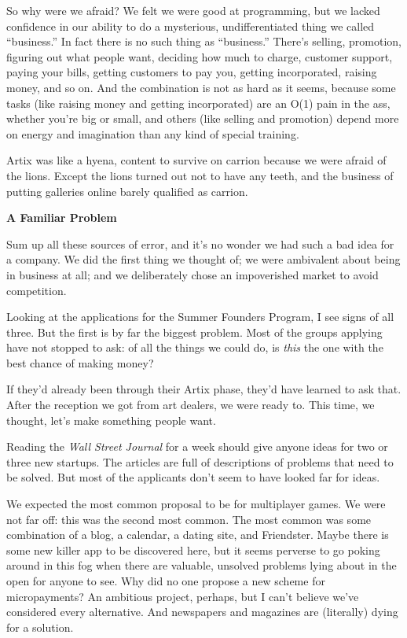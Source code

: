 So why were we afraid? We felt we were good at programming, but we
lacked confidence in our ability to do a mysterious, undifferentiated
thing we called ``business.'' In fact there is no such thing as
``business.'' There's selling, promotion, figuring out what people want,
deciding how much to charge, customer support, paying your bills,
getting customers to pay you, getting incorporated, raising money, and
so on. And the combination is not as hard as it seems, because some
tasks (like raising money and getting incorporated) are an O(1) pain in
the ass, whether you're big or small, and others (like selling and
promotion) depend more on energy and imagination than any kind of
special training.

Artix was like a hyena, content to survive on carrion because we were
afraid of the lions. Except the lions turned out not to have any teeth,
and the business of putting galleries online barely qualified as
carrion.

\textbf{A Familiar Problem}

Sum up all these sources of error, and it's no wonder we had such a bad
idea for a company. We did the first thing we thought of; we were
ambivalent about being in business at all; and we deliberately chose an
impoverished market to avoid competition.

Looking at the applications for the Summer Founders Program, I see signs
of all three. But the first is by far the biggest problem. Most of the
groups applying have not stopped to ask: of all the things we could do,
is \emph{this} the one with the best chance of making money?

If they'd already been through their Artix phase, they'd have learned to
ask that. After the reception we got from art dealers, we were ready to.
This time, we thought, let's make something people want.

Reading the \emph{Wall Street Journal} for a week should give anyone
ideas for two or three new startups. The articles are full of
descriptions of problems that need to be solved. But most of the
applicants don't seem to have looked far for ideas.

We expected the most common proposal to be for multiplayer games. We
were not far off: this was the second most common. The most common was
some combination of a blog, a calendar, a dating site, and Friendster.
Maybe there is some new killer app to be discovered here, but it seems
perverse to go poking around in this fog when there are valuable,
unsolved problems lying about in the open for anyone to see. Why did no
one propose a new scheme for micropayments? An ambitious project,
perhaps, but I can't believe we've considered every alternative. And
newspapers and magazines are (literally) dying for a solution.

